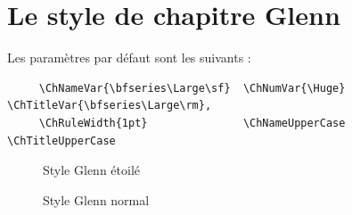 \documentclass{report}
\begin{document}
    \section{Le style de chapitre Glenn}
    Les paramètres par défaut sont les suivants :
    {\small\begin{verbatim}
     \ChNameVar{\bfseries\Large\sf}  \ChNumVar{\Huge}  \ChTitleVar{\bfseries\Large\rm}, 
     \ChRuleWidth{1pt}               \ChNameUpperCase  \ChTitleUpperCase
    \end{verbatim}}
    \begin{figure}[h]
      \begin{minipage}{7 cm}
        \centerline{\color{gray!25}}
        \caption{Style Glenn \og étoilé \fg{}}
      \end{minipage}\hfill
      \begin{minipage}{7 cm}
        \centerline{\color{gray!25}}
        \caption{Style Glenn \og normal \fg{}}
      \end{minipage}\hfill
    \end{figure}
\end{document}
